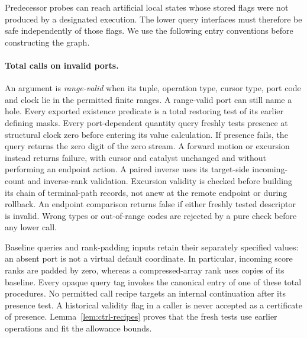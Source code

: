 Predecessor probes can reach artificial local states whose stored flags
were not produced by a designated execution.  The lower query interfaces
must therefore be safe independently of those flags.  We use the
following entry conventions before constructing the graph.

\paragraph{Total calls on invalid ports.}
An argument is \emph{range-valid} when its tuple, operation type,
cursor type, port code and clock lie in the permitted finite ranges.
A range-valid port can still name a hole. Every exported existence
predicate is a total restoring test of its earlier defining masks.
Every port-dependent quantity query freshly tests presence at structural
clock zero before entering its value calculation. If presence fails,
the query returns the zero digit of the zero stream. A forward motion
or excursion instead returns failure, with cursor and catalyst unchanged
and without performing an endpoint action. A paired inverse uses its
target-side incoming-count and inverse-rank validation. Excursion
validity is checked before building its chain of terminal-path records, not anew at the
remote endpoint or during rollback. An endpoint comparison returns
false if either freshly tested descriptor is invalid. Wrong types or
out-of-range codes are rejected by a pure check before any lower call.

Baseline queries and rank-padding inputs retain their separately
specified values: an absent port is not a virtual default coordinate.
In particular, incoming score ranks are padded by zero, whereas a
compressed-array rank uses copies of its baseline. Every opaque query
tag invokes the canonical entry of one of these total procedures.
No permitted call recipe targets an internal continuation after its
presence test. A historical validity flag in a caller is never accepted
as a certificate of presence. Lemma~\ref{lem:ctrl-recipes} proves that
the fresh tests use earlier operations and fit the allowance bounds.

